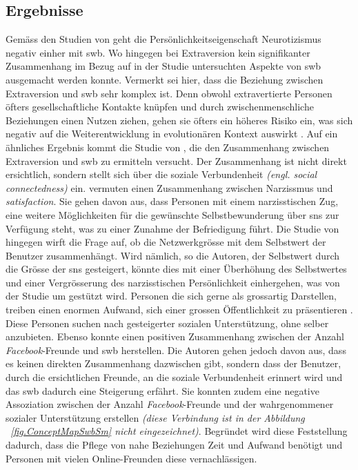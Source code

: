 \subsection{Ergebnisse}\label{subsec.traitsErgebnisse}
Gemäss den Studien von  geht die Persönlichkeitseigenschaft Neurotizismus negativ einher mit \gls{swb}. Wo hingegen bei Extraversion kein signifikanter Zusammenhang im Bezug auf in der Studie untersuchten Aspekte von \gls{swb} ausgemacht werden konnte. Vermerkt sei hier, dass die Beziehung zwischen Extraversion und \gls{swb} sehr komplex ist. Denn obwohl extravertierte Personen öfters gesellschaftliche Kontakte knüpfen und durch zwischenmenschliche Beziehungen einen Nutzen ziehen, gehen sie öfters ein höheres Risiko ein, was sich negativ auf die Weiterentwicklung in evolutionären Kontext auswirkt \cite{Nettle:2005}. Auf ein ähnliches Ergebnis kommt die Studie von , die den Zusammenhang zwischen Extraversion und \gls{swb} zu ermitteln versucht. Der Zusammenhang ist nicht direkt ersichtlich, sondern stellt sich über die soziale Verbundenheit \textit{(engl. social connectedness)} ein.\newline
{} vermuten einen Zusammenhang zwischen Narzissmus und \textit{satisfaction}. Sie gehen davon aus, dass Personen mit einem narzisstischen Zug, eine weitere Möglichkeiten  für die gewünschte Selbstbewunderung über \gls{sns} zur Verfügung steht, was zu einer Zunahme der Befriedigung führt. Die Studie von  hingegen wirft die Frage auf, ob die Netzwerkgrösse mit dem Selbstwert der Benutzer zusammenhängt. Wird nämlich, so die Autoren, der Selbstwert durch die Grösse der \gls{sns} gesteigert, könnte dies mit einer Überhöhung des Selbstwertes und einer Vergrösserung des narzisstischen Persönlichkeit einhergehen, was von der Studie um  gestützt wird. Personen die sich gerne als grossartig Darstellen, treiben einen enormen Aufwand, sich einer grossen Öffentlichkeit zu präsentieren \cite{Carpenter:2012}. Diese Personen suchen nach gesteigerter sozialen Unterstützung, ohne selber anzubieten. \newline
Ebenso konnte  einen positiven Zusammenhang zwischen der Anzahl \textit{Facebook}-Freunde und \gls{swb} herstellen. Die Autoren gehen jedoch davon aus, dass es keinen direkten Zusammenhang dazwischen gibt, sondern dass der Benutzer, durch die ersichtlichen Freunde, an die soziale Verbundenheit erinnert wird und das \gls{swb} dadurch eine Steigerung erfährt. Sie konnten zudem eine negative Assoziation zwischen der Anzahl \textit{Facebook}-Freunde und der wahrgenommener sozialer Unterstützung erstellen \textit{(diese Verbindung ist in der Abbildung ~\ref{fig.ConceptMapSwbSm} nicht eingezeichnet)}. Begründet wird diese Feststellung dadurch, dass  die Pflege von nahe Beziehungen Zeit und Aufwand benötigt und Personen mit vielen Online-Freunden diese vernachlässigen.\newline
